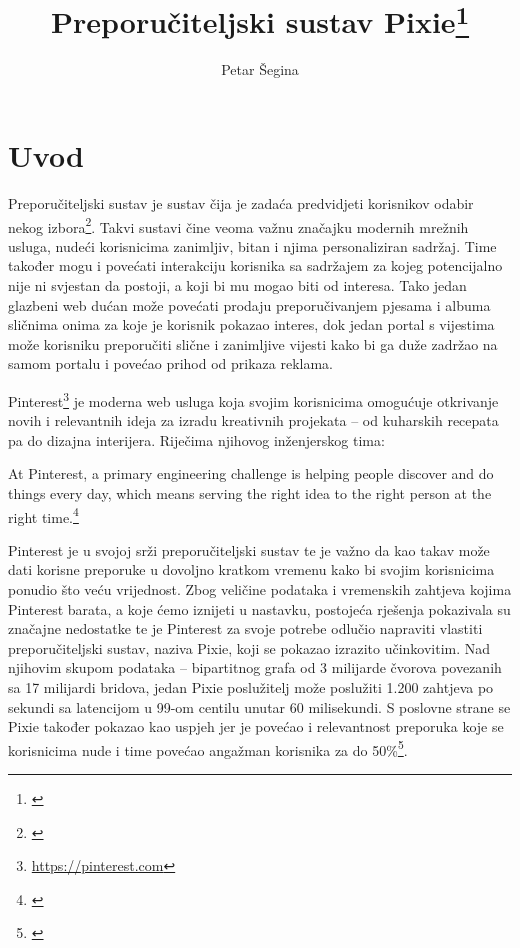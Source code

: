 \documentclass[times, utf8, seminar]{fer}
\begin{document}
\title{Preporučiteljski sustav Pixie\footnote{\cite{DBLP:journals/corr/abs-1711-07601}}}

\author{Petar Šegina}


\maketitle

\tableofcontents

\chapter{Uvod}

Preporučiteljski sustav je sustav čija je zadaća predvidjeti korisnikov odabir nekog izbora\footnote{\cite{mmd}}. Takvi sustavi čine veoma važnu značajku modernih mrežnih usluga, nudeći korisnicima zanimljiv, bitan i njima personaliziran sadržaj. Time također mogu i povećati interakciju korisnika sa sadržajem za kojeg potencijalno nije ni svjestan da postoji, a koji bi mu mogao biti od interesa. Tako jedan glazbeni web dućan može povećati prodaju preporučivanjem pjesama i albuma sličnima onima za koje je korisnik pokazao interes, dok jedan portal s vijestima može korisniku preporučiti slične i zanimljive vijesti kako bi ga duže zadržao na samom portalu i povećao prihod od prikaza reklama.

Pinterest\footnote{\url{https://pinterest.com}} je moderna web usluga koja svojim korisnicima omogućuje otkrivanje novih i relevantnih ideja za izradu kreativnih projekata -- od kuharskih recepata pa do dizajna interijera. Riječima njihovog inženjerskog tima:

\begin{displayquote}
		  At Pinterest, a primary engineering challenge is helping people discover and do things every day, which means serving the right idea to the right person at the right time.\footnote{\cite{medium-article}}
\end{displayquote}

Pinterest je u svojoj srži preporučiteljski sustav te je važno da kao takav može dati korisne preporuke u dovoljno kratkom vremenu kako bi svojim korisnicima ponudio što veću vrijednost. Zbog veličine podataka i vremenskih zahtjeva kojima Pinterest barata, a koje ćemo iznijeti u nastavku, postojeća rješenja pokazivala su značajne nedostatke te je Pinterest za svoje potrebe odlučio napraviti vlastiti preporučiteljski sustav, naziva Pixie, koji se pokazao izrazito učinkovitim. Nad njihovim skupom podataka -- bipartitnog grafa od 3 milijarde čvorova povezanih sa 17 milijardi bridova, jedan Pixie poslužitelj može poslužiti 1.200 zahtjeva po sekundi sa latencijom u 99-om centilu unutar 60 milisekundi. S poslovne strane se Pixie također pokazao kao uspjeh jer je povećao i relevantnost preporuka koje se korisnicima nude i time povećao angažman korisnika za do 50\%\footnote{\cite{DBLP:journals/corr/abs-1711-07601}}.
\end{document}
